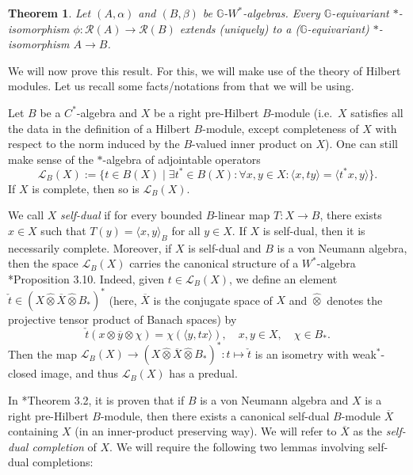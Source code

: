 \documentclass[reqno]{amsart}
\numberwithin{equation}{section}
\newtheorem{Theorem}{Theorem}[section]
\newcommand{\G}{\mathbb{G}}
\begin{document}
\begin{Theorem}\label{important inbetween}
Let $(A, \alpha)$ and $(B, \beta)$ be $\G$-$W^*$-algebras. Every $\G$-equivariant $*$-isomorphism $\phi: \mathcal{R}(A)\to \mathcal{R}(B)$ extends (uniquely) to a ($\G$-equivariant) $*$-isomorphism $A \to B$. 
\end{Theorem}
We will now prove this result. For this, we will make use of the theory of Hilbert modules. Let us recall some facts/notations from \cite{Pa73} that we will be using.

Let $B$ be a $C^*$-algebra and $X$ be a right pre-Hilbert $B$-module (i.e.\ $X$ satisfies all the data in the definition of a Hilbert $B$-module, except completeness of $X$ with respect to the norm induced by the $B$-valued inner product on $X$). One can still make sense of the $*$-algebra of adjointable operators $$\mathscr{L}_B(X):=\{t \in B(X)\mid \exists t^*\in B(X): \forall x,y \in X: \langle x,ty\rangle = \langle t^*x, y\rangle\}.$$ If $X$ is complete, then so is $\mathscr{L}_B(X)$.

We call $X$ \emph{self-dual} \cite{Pa73} if for every bounded $B$-linear map $T:X\to B$, there exists $x\in X$ such that $T(y)= \langle x,y \rangle_B$ for all $y\in X$. If $X$ is self-dual, then it is necessarily complete. Moreover, if $X$ is self-dual and $B$ is a von Neumann algebra, then the space $\mathscr{L}_B(X)$ carries the canonical structure of a $W^*$-algebra \cite{Pa73}*{Proposition 3.10}. Indeed, given $t\in \mathscr{L}_B(X)$, we define an element $\check{t} \in (X \hat{\otimes} \overline{X} \hat{\otimes} B_*)^*$ (here, $\overline{X}$ is the conjugate space of $X$ and $\hat{\otimes}$ denotes the projective tensor product of Banach spaces) by
$$\check{t}(x\otimes \overline{y}\otimes \chi)= \chi(\langle y,tx\rangle), \quad x,y\in X, \quad \chi \in B_*.$$
Then the map
$\mathscr{L}_B(X)\to (X\hat{\otimes}\overline{X}\hat{\otimes} B_*)^*: t \mapsto \check{t}$
is an isometry with weak$^*$-closed image, and thus $\mathscr{L}_B(X)$ has a predual.


In \cite{Pa73}*{Theorem 3.2}, it is proven that if $B$ is a von Neumann algebra and $X$ is a right pre-Hilbert $B$-module, then there exists a canonical self-dual $B$-module $\overline{X}$ containing $X$ (in an inner-product preserving way). We will refer to $\overline{X}$ as the \emph{self-dual completion} of $X$. We will require the following two lemmas involving self-dual completions:
\end{document}
